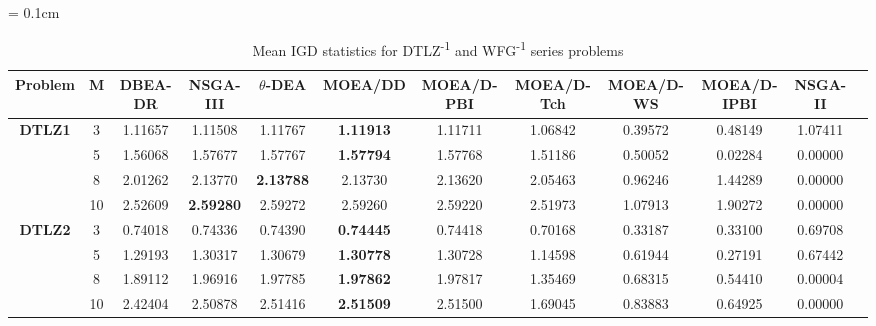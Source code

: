 \documentclass{sig-alternate}
\begin{document}
\begin{table}[!htb]\scriptsize
	\centering
	\renewcommand{\arraystretch}{0.9}
	\caption{Mean IGD statistics for DTLZ\textsuperscript{-1} and WFG\textsuperscript{-1} series problems}
	\label{tab:IGDminus}
	\tabcolsep = 0.1cm
	\begin{tabular}{|c|c|c|c|c|c|c|c|c|c|c|c|}
		\noalign{\smallskip}\hline
		\textbf{Problem}                & \textbf{M} & \textbf{DBEA-DR} & \textbf{NSGA-III} & \textbf{$\theta$-DEA} & \textbf{MOEA/DD} & \textbf{MOEA/D-PBI} & \textbf{MOEA/D-Tch} & \textbf{MOEA/D-WS} & \textbf{MOEA/D-IPBI} & \textbf{NSGA-II} \\ \hline
		\multirow{4}{*}{\textbf{DTLZ1}} & 3          & 1.11657          & 1.11508           & 1.11767               & \textbf{1.11913} & 1.11711             & 1.06842             & 0.39572            & 0.48149              & 1.07411          \\ \cline{2-11} 
		& 5          & 1.56068          & 1.57677           & 1.57767               & \textbf{1.57794} & 1.57768             & 1.51186             & 0.50052            & 0.02284              & 0.00000          \\ \cline{2-11} 
		& 8          & 2.01262          & 2.13770           & \textbf{2.13788}      & 2.13730          & 2.13620             & 2.05463             & 0.96246            & 1.44289              & 0.00000          \\ \cline{2-11} 
		& 10         & 2.52609          & \textbf{2.59280}  & 2.59272               & 2.59260          & 2.59220             & 2.51973             & 1.07913            & 1.90272              & 0.00000          \\ \hline
		\multirow{4}{*}{\textbf{DTLZ2}} & 3          & 0.74018          & 0.74336           & 0.74390               & \textbf{0.74445} & 0.74418             & 0.70168             & 0.33187            & 0.33100              & 0.69708          \\ \cline{2-11} 
		& 5          & 1.29193          & 1.30317           & 1.30679               & \textbf{1.30778} & 1.30728             & 1.14598             & 0.61944            & 0.27191              & 0.67442          \\ \cline{2-11} 
		& 8          & 1.89112          & 1.96916           & 1.97785               & \textbf{1.97862} & 1.97817             & 1.35469             & 0.68315            & 0.54410              & 0.00004          \\ \cline{2-11} 
		& 10         & 2.42404          & 2.50878           & 2.51416               & \textbf{2.51509} & 2.51500             & 1.69045             & 0.83883            & 0.64925              & 0.00000          \\ \hline

\end{tabular}
\end{table}
\end{document}
